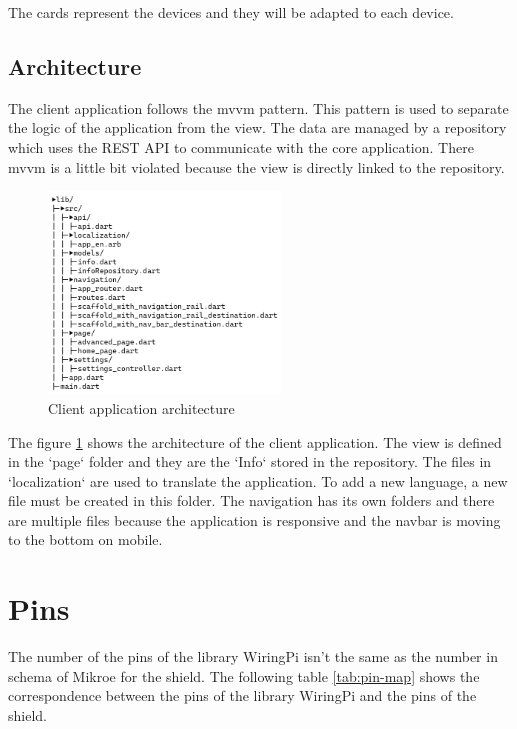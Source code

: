 The cards represent the devices and they will be adapted to each device.

\subsection{Architecture}
\label{conception:client-application:architecture}

The client application follows the \acrfull{mvvm} pattern.
This pattern is used to separate the logic of the application from the view.
The data are managed by a repository which uses the REST API to communicate with the core application.
There \acrshort{mvvm} is a little bit violated because the view is directly linked to the repository.

\begin{figure}[h]
  \centering
  \includegraphics[width=0.55\textwidth]{img/conception_architecture.excalidraw.png}
  \caption{Client application architecture}
  \label{fig:conception:client-application:architecture:illustration}
\end{figure}

The figure \ref{fig:conception:client-application:architecture:illustration} shows the architecture of the client application.
The view is defined in the `page` folder and they are the `Info` stored in the repository.
The files in `localization` are used to translate the application.
To add a new language, a new file must be created in this folder.
The navigation has its own folders and there are multiple files because the application is responsive and the navbar is moving to the bottom on mobile.



\section{Pins}
\label{sec:pins}

The number of the pins of the library WiringPi isn't the same as the number in schema of Mikroe for the shield.
The following table \ref{tab:pin-map} shows the correspondence between the pins of the library WiringPi and the pins of the shield.


